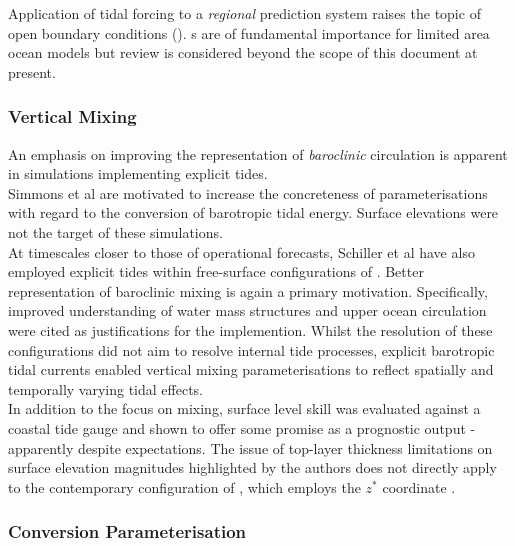 Application of tidal forcing to a \emph{regional} prediction system raises the topic of open boundary conditions (\obc{}).  \obc{}s are of fundamental importance for limited area ocean models but review is considered beyond the scope of this document at present.\\


\subsubsection{Vertical Mixing}

An emphasis on improving the representation of \emph{baroclinic} circulation is apparent in \OGCM{} simulations implementing explicit tides.\\
Simmons et al \citep{Simmons:2004fi} are motivated to increase the concreteness of parameterisations with regard to the conversion of barotropic tidal energy.  Surface elevations were not the target of these simulations. \\


At timescales closer to those of operational forecasts, Schiller et al have also employed explicit tides within free-surface configurations of \MOM{}.  
Better representation of baroclinic mixing is again a primary motivation. 
Specifically, improved understanding of water mass structures \cite{Schiller:2004fv} and upper ocean circulation \cite{Schiller:2007gk} were cited as justifications for the implemention.  
Whilst the resolution of these configurations did not aim to resolve internal tide processes, explicit barotropic tidal currents enabled vertical mixing parameterisations to reflect spatially and temporally varying tidal effects.\\
In addition to the focus on mixing, surface level skill was evaluated against a coastal tide gauge and shown to offer some promise as a prognostic output \citep[Fig 2]{Schiller:2007gk} - apparently despite expectations.   
The issue of top-layer thickness limitations on surface elevation magnitudes highlighted by the authors does not directly apply to the contemporary \BL{} configuration of \MOM{}, which employs the $z^*$ coordinate \citep{Brassington:2012wm}.\\


\subsubsection{Conversion Parameterisation}

